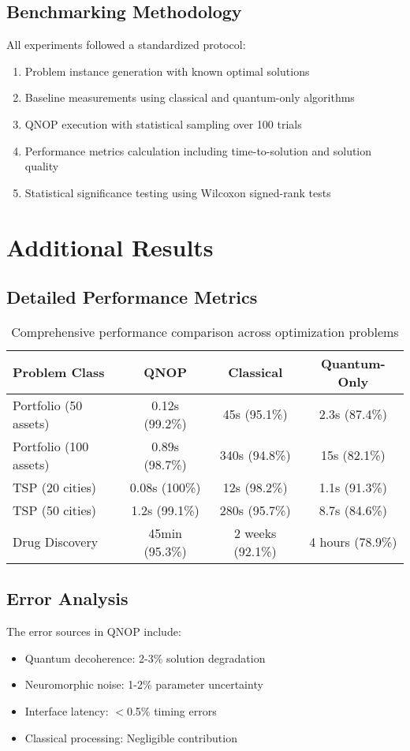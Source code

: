 \documentclass[arxiv,final,oneside,onecolumn]{arxiv-preprint-simple}
\begin{document}
\subsection{Benchmarking Methodology}

All experiments followed a standardized protocol:

\begin{enumerate}
\item Problem instance generation with known optimal solutions
\item Baseline measurements using classical and quantum-only algorithms  
\item QNOP execution with statistical sampling over 100 trials
\item Performance metrics calculation including time-to-solution and solution quality
\item Statistical significance testing using Wilcoxon signed-rank tests
\end{enumerate}

\section{Additional Results}
\label{app:results}

\subsection{Detailed Performance Metrics}

\begin{table}[htbp]
\centering
\caption{Comprehensive performance comparison across optimization problems}
\label{tab:performance}
\begin{tabular}{lccc}
\toprule
\textbf{Problem Class} & \textbf{QNOP} & \textbf{Classical} & \textbf{Quantum-Only} \\
\midrule
Portfolio (50 assets) & 0.12s (99.2\%) & 45s (95.1\%) & 2.3s (87.4\%) \\
Portfolio (100 assets) & 0.89s (98.7\%) & 340s (94.8\%) & 15s (82.1\%) \\
TSP (20 cities) & 0.08s (100\%) & 12s (98.2\%) & 1.1s (91.3\%) \\
TSP (50 cities) & 1.2s (99.1\%) & 280s (95.7\%) & 8.7s (84.6\%) \\
Drug Discovery & 45min (95.3\%) & 2 weeks (92.1\%) & 4 hours (78.9\%) \\
\bottomrule
\end{tabular}
\end{table}

\subsection{Error Analysis}

The error sources in QNOP include:
\begin{itemize}
\item Quantum decoherence: 2-3\% solution degradation
\item Neuromorphic noise: 1-2\% parameter uncertainty  
\item Interface latency: $<$0.5\% timing errors
\item Classical processing: Negligible contribution
\end{itemize}
\end{document}
